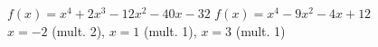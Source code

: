 {$f(x) = x^{4} + 2x^{3} - 12x^{2} - 40x - 32$}
{$f(x) = x^{4} - 9x^{2} - 4x + 12$ \\ $x = -2$ (mult. 2), $x = 1$ (mult. 1), $x = 3$ (mult. 1)}